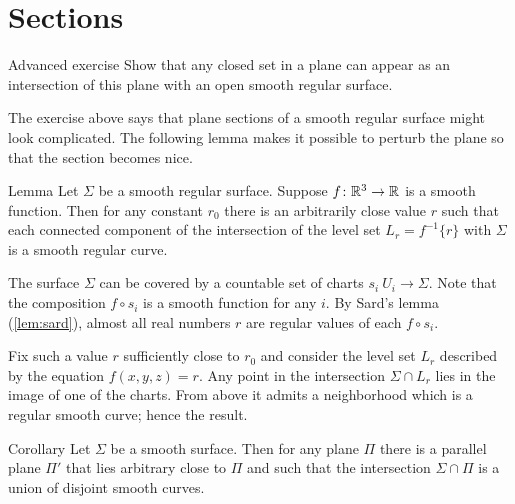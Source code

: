 \section*{Sections}%

\begin{thm}{Advanced exercise}\label{ex:plane-section}
Show that any closed set in a plane can appear as an intersection of this plane with an open smooth regular surface.  
\end{thm}

The exercise above says that plane sections of a smooth regular surface might look complicated.
The following lemma makes it possible to perturb the plane so that the section becomes nice.

\begin{thm}{Lemma}\label{lem:reg-section}
Let $\Sigma$ be a smooth regular surface.
Suppose $f\:\RR^3\z\to\RR$ is a smooth function.
Then for any constant $r_0$ there is an arbitrarily close value $r$ such that 
each connected component of the intersection of the level set $L_{r}=f^{-1}\{r\}$ with
$\Sigma$ is a smooth regular curve.
\end{thm}

The surface $\Sigma$ can be covered by a countable set of charts $s_i\:U_i\to \Sigma$.
Note that the composition $f\circ s_i$ is a smooth function for any $i$.
By Sard's lemma (\ref{lem:sard}), almost all real numbers $r$ are regular values of each $f\circ s_i$.

Fix such a value $r$ sufficiently close to $r_0$ and consider the level set $L_r$ described by the equation $f(x,y,z)=r$.
Any point in the intersection $\Sigma\cap L_r$ lies in the image of one of the charts.
From above it admits a neighborhood which is a regular smooth curve;
hence the result.\qeds

\begin{thm}{Corollary}
Let $\Sigma$ be a smooth surface.
Then for any plane $\Pi$ there is a parallel plane $\Pi'$ that lies arbitrary close to $\Pi$ and such that the intersection $\Sigma\cap\Pi$ is a union of disjoint smooth curves.
\end{thm}



